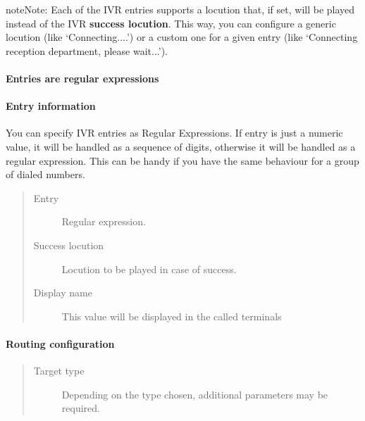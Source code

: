 \documentclass[letterpaper,10pt,english]{sphinxmanual}
\begin{document}
\begin{notice}{note}{Note:}
Each of the IVR entries supports a locution that, if set,
will be played instead of the IVR \textbf{success locution}. This way, you can
configure a generic locution (like `Connecting....') or a custom one for
a given entry (like `Connecting reception department, please wait...').
\end{notice}
\paragraph{Entries are regular expressions}


\paragraph{Entry information}
\label{administration_portal/client/vpbx/routing_endpoints/ivrs:entry-information}
You can specify IVR entries as Regular Expressions. If entry is just
a numeric value, it will be handled as a sequence of digits, otherwise it
will be handled as a regular expression. This can be handy if you have the
same behaviour for a group of dialed numbers.
\begin{quote}
\begin{description}
\item[{Entry}] \leavevmode
Regular expression.

\item[{Success locution}] \leavevmode
Locution to be played in case of success.

\item[{Display name}] \leavevmode
This value will be displayed in the called terminals

\end{description}
\end{quote}


\paragraph{Routing configuration}
\label{administration_portal/client/vpbx/routing_endpoints/ivrs:routing-configuration}\begin{quote}
\begin{description}
\item[{Target type}] \leavevmode
Depending on the type chosen, additional parameters may be required.

\end{description}
\end{quote}
\end{document}
